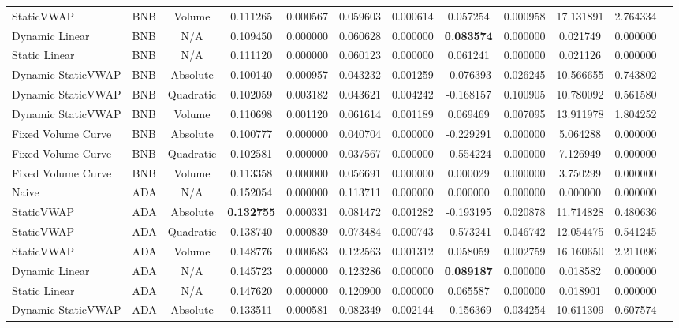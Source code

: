 \begin{table}[H]
{\begin{tabular}{llcccccccccc}
        StaticVWAP & BNB & Volume & 0.111265 & 0.000567 & 0.059603 & 0.000614 & 0.057254 & 0.000958 & 17.131891 & 2.764334 \\
        Dynamic Linear & BNB & N/A & 0.109450 & 0.000000 & 0.060628 & 0.000000 & \textbf{0.083574} & 0.000000 & 0.021749 & 0.000000 \\
        Static Linear & BNB & N/A & 0.111120 & 0.000000 & 0.060123 & 0.000000 & 0.061241 & 0.000000 & 0.021126 & 0.000000 \\
        Dynamic StaticVWAP & BNB & Absolute & 0.100140 & 0.000957 & 0.043232 & 0.001259 & -0.076393 & 0.026245 & 10.566655 & 0.743802 \\
        Dynamic StaticVWAP & BNB & Quadratic & 0.102059 & 0.003182 & 0.043621 & 0.004242 & -0.168157 & 0.100905 & 10.780092 & 0.561580 \\
        Dynamic StaticVWAP & BNB & Volume & 0.110698 & 0.001120 & 0.061614 & 0.001189 & 0.069469 & 0.007095 & 13.911978 & 1.804252 \\
        Fixed Volume Curve & BNB & Absolute & 0.100777 & 0.000000 & 0.040704 & 0.000000 & -0.229291 & 0.000000 & 5.064288 & 0.000000 \\
        Fixed Volume Curve & BNB & Quadratic & 0.102581 & 0.000000 & 0.037567 & 0.000000 & -0.554224 & 0.000000 & 7.126949 & 0.000000 \\
        Fixed Volume Curve & BNB & Volume & 0.113358 & 0.000000 & 0.056691 & 0.000000 & 0.000029 & 0.000000 & 3.750299 & 0.000000 \\
        \hline
        Naive & ADA & N/A & 0.152054 & 0.000000 & 0.113711 & 0.000000 & 0.000000 & 0.000000 & 0.000000 & 0.000000 \\
        StaticVWAP & ADA & Absolute & \textbf{0.132755} & 0.000331 & 0.081472 & 0.001282 & -0.193195 & 0.020878 & 11.714828 & 0.480636 \\
        StaticVWAP & ADA & Quadratic & 0.138740 & 0.000839 & 0.073484 & 0.000743 & -0.573241 & 0.046742 & 12.054475 & 0.541245 \\
        StaticVWAP & ADA & Volume & 0.148776 & 0.000583 & 0.122563 & 0.001312 & 0.058059 & 0.002759 & 16.160650 & 2.211096 \\
        Dynamic Linear & ADA & N/A & 0.145723 & 0.000000 & 0.123286 & 0.000000 & \textbf{0.089187} & 0.000000 & 0.018582 & 0.000000 \\
        Static Linear & ADA & N/A & 0.147620 & 0.000000 & 0.120900 & 0.000000 & 0.065587 & 0.000000 & 0.018901 & 0.000000 \\
        Dynamic StaticVWAP & ADA & Absolute & 0.133511 & 0.000581 & 0.082349 & 0.002144 & -0.156369 & 0.034254 & 10.611309 & 0.607574 \\

\end{tabular}}
\end{table}
